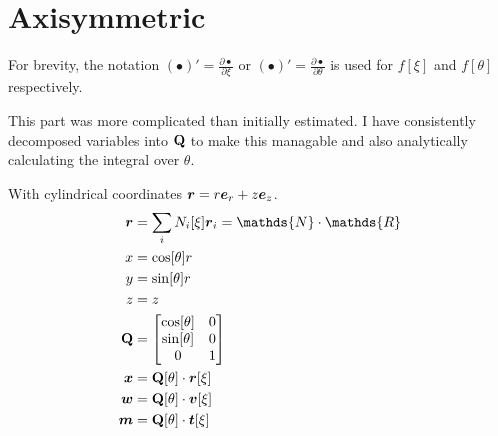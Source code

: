 \documentclass[a4paper,11pt]{article}
\renewcommand{\to}[1]{\text{\boldmath $#1$}} %
\newcommand{\ts}[1]{\text{\boldmath $\mathrm{#1}$}} %
\newcommand{\uv}[1]{\mathds{#1}}
\newcommand{\um}[1]{\mathds{#1}}
\newcommand{\pderiv}[2]{\frac{\partial#1}{\partial#2}}
\begin{document}
\section{Axisymmetric}
For brevity, the notation $(\bullet)' = \pderiv{\bullet}{\xi}$ or $(\bullet)' = \pderiv{\bullet}{\theta}$ is used for $f[\xi]$ and $f[\theta]$ respectively.

This part was more complicated than initially estimated.
I have consistently decomposed variables into $\ts Q$ to make this managable and also analytically calculating the integral over $\theta$.

With cylindrical coordinates $\to r = r\to e_r + z \to e_z$.
\begin{align}
 \to r &= \sum_i N_i[\xi]\to r_i = \um N\cdot \uv R\\
 x &= \cos[\theta] r\\
 y &= \sin[\theta] r\\
 z &= z\\
 \ts Q &= \begin{bmatrix}\cos[\theta] & 0\\ \sin[\theta] & 0\\ 0 & 1\end{bmatrix}\\
 \to x &= \ts Q[\theta] \cdot \to r[\xi]\\
 \to w &= \ts Q[\theta] \cdot \to v[\xi]\\
 \to m &= \ts Q[\theta] \cdot \to t[\xi]
\end{align}
\end{document}
